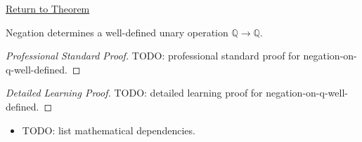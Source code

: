 \newpage
{}
\label{prf:negation-on-q-well-defined}

\begin{remark*}[Return]
\hyperref[thm:negation-on-q-well-defined]{Return to Theorem}
\end{remark*}

\begin{theorem*}
Negation determines a well-defined unary operation $\mathbb{Q}\to\mathbb{Q}$.
\end{theorem*}

\begin{proof}[Professional Standard Proof]
\LRAProofBodyStart
TODO: professional standard proof for negation-on-q-well-defined.
\end{proof}

\begin{proof}[Detailed Learning Proof]
\LRAProofBodyStart
TODO: detailed learning proof for negation-on-q-well-defined.
\end{proof}

\begin{remark*}
\end{remark*}

\begin{dependencies}
\begin{itemize}
  \item TODO: list mathematical dependencies.
\end{itemize}
\end{dependencies}

\clearpage
